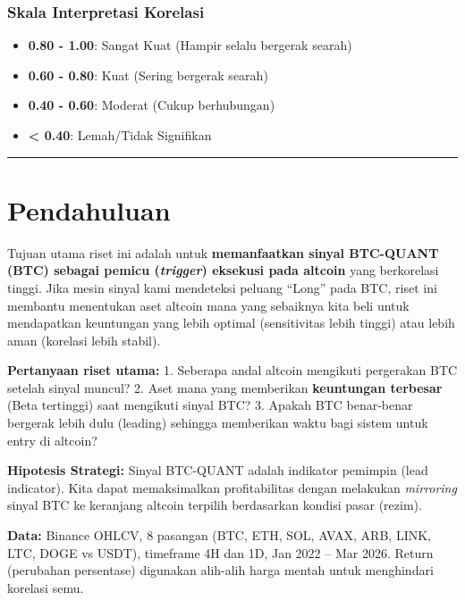 \documentclass[
  11pt,
  a4paper,
]{article}
\providecommand{\tightlist}{%
  \setlength{\itemsep}{0pt}\setlength{\parskip}{0pt}}
\begin{document}
\subsubsection{Skala Interpretasi
Korelasi}\label{skala-interpretasi-korelasi}

\begin{itemize}
\tightlist
\item
  \textbf{0.80 - 1.00}: Sangat Kuat (Hampir selalu bergerak searah)
\item
  \textbf{0.60 - 0.80}: Kuat (Sering bergerak searah)
\item
  \textbf{0.40 - 0.60}: Moderat (Cukup berhubungan)
\item
  \textbf{\textless{} 0.40}: Lemah/Tidak Signifikan
\end{itemize}

\begin{center}\rule{0.5\linewidth}{0.5pt}\end{center}

\section{Pendahuluan}\label{pendahuluan}

Tujuan utama riset ini adalah untuk \textbf{memanfaatkan sinyal
BTC-QUANT (BTC) sebagai pemicu (\emph{trigger}) eksekusi pada altcoin}
yang berkorelasi tinggi. Jika mesin sinyal kami mendeteksi peluang
``Long'' pada BTC, riset ini membantu menentukan aset altcoin mana yang
sebaiknya kita beli untuk mendapatkan keuntungan yang lebih optimal
(sensitivitas lebih tinggi) atau lebih aman (korelasi lebih stabil).

\textbf{Pertanyaan riset utama:} 1. Seberapa andal altcoin mengikuti
pergerakan BTC setelah sinyal muncul? 2. Aset mana yang memberikan
\textbf{keuntungan terbesar} (Beta tertinggi) saat mengikuti sinyal BTC?
3. Apakah BTC benar-benar bergerak lebih dulu (leading) sehingga
memberikan waktu bagi sistem untuk entry di altcoin?

\textbf{Hipotesis Strategi:} Sinyal BTC-QUANT adalah indikator pemimpin
(lead indicator). Kita dapat memaksimalkan profitabilitas dengan
melakukan \emph{mirroring} sinyal BTC ke keranjang altcoin terpilih
berdasarkan kondisi pasar (rezim).

\textbf{Data:} Binance OHLCV, 8 pasangan (BTC, ETH, SOL, AVAX, ARB,
LINK, LTC, DOGE vs USDT), timeframe 4H dan 1D, Jan 2022 -- Mar 2026.
Return (perubahan persentase) digunakan alih-alih harga mentah untuk
menghindari korelasi semu.
\end{document}
